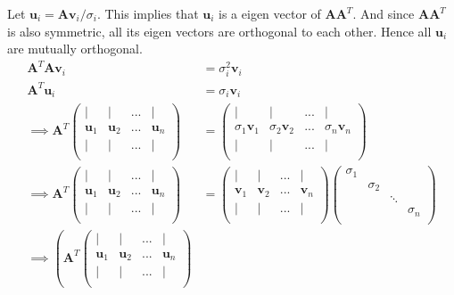 \documentclass[12pt, letterpaper]{article}
\begin{document}
Let $\mathbf{u}_i = \mathbf{Av}_i/\sigma_i$. This implies that $\mathbf{u}_i$ is a eigen vector of $\mathbf{AA}^T$. And since $\mathbf{AA}^T$ is also symmetric, all its eigen vectors are orthogonal to each other. Hence all $\mathbf{u}_i$ are mutually orthogonal.\\
\begin{align*}
  \mathbf{A}^T\mathbf{Av}_i &= \sigma_i^2\mathbf{v}_i\\
  \mathbf{A}^T\mathbf{u}_i &= \sigma_i\mathbf{v}_i\\
  \implies \mathbf{A}^T
  \begin{pmatrix}
    |&|&...&|\\
    \mathbf{u}_1&\mathbf{u}_2&...&\mathbf{u}_n\\
    |&|&...&|\\
  \end{pmatrix}
  &= \begin{pmatrix}
    |&|&...&|\\
    \sigma_1\mathbf{v}_1&\sigma_2\mathbf{v}_2&...&\sigma_n\mathbf{v}_n\\
    |&|&...&|\\
  \end{pmatrix}\\
  \implies \mathbf{A}^T
  \begin{pmatrix}
    |&|&...&|\\
    \mathbf{u}_1&\mathbf{u}_2&...&\mathbf{u}_n\\
    |&|&...&|\\
  \end{pmatrix}
  &= \begin{pmatrix}
    |&|&...&|\\
    \mathbf{v}_1&\mathbf{v}_2&...&\mathbf{v}_n\\
    |&|&...&|\\
  \end{pmatrix}
  \begin{pmatrix}
    \sigma_1& & & \\
    &\sigma_2& &\\
    & &\ddots&\\
    & & &\sigma_n\\
  \end{pmatrix}\\
  \implies \left(\mathbf{A}^T
  \begin{pmatrix}
    |&|&...&|\\
    \mathbf{u}_1&\mathbf{u}_2&...&\mathbf{u}_n\\
    |&|&...&|\\

\end{pmatrix}
\end{align*}
\end{document}
